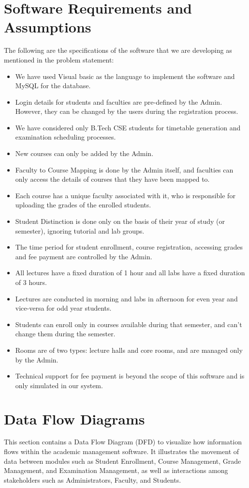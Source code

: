 \documentclass[12pt,a4paper]{article}
\begin{document}
\section{Software Requirements and Assumptions}
The following are the specifications of the software that we are developing as mentioned in the problem statement:
\begin{itemize}
    \item We have used Visual basic as the language to implement the software and MySQL for the database.
    \item Login details for students and faculties are pre-defined by the Admin. However, they can be changed by the users during the registration process.
    \item We have considered only B.Tech CSE students for timetable generation and examination scheduling processes.
    \item New courses can only be added by the Admin.
    \item Faculty to Course Mapping is done by the Admin itself, and faculties can only access the details of courses that they have been mapped to.
    \item Each course has a unique faculty associated with it, who is responsible for uploading the grades of the enrolled students.
    \item Student Distinction is done only on the basis of their year of study (or semester), ignoring tutorial and lab groups.
    \item The time period for student enrollment, course registration, accessing grades and fee payment are controlled by the Admin.
    \item All lectures have a fixed duration of 1 hour and all labs have a fixed duration of 3 hours.
    \item Lectures are conducted in morning and labs in afternoon for even year and vice-versa for odd year students.
    \item Students can enroll only in courses available during that semester, and can't change them during the semester.
    \item Rooms are of two types: lecture halls and core rooms, and are managed only by the Admin.
    \item Technical support for fee payment is beyond the scope of this software and is only simulated in our system.
\end{itemize}

\section{Data Flow Diagrams}
This section contains a Data Flow Diagram (DFD) to visualize how information flows within the academic management software. It illustrates the movement of data between modules such as Student Enrollment, Course Management, Grade Management, and Examination Management, as well as interactions among stakeholders such as Administrators, Faculty, and Students.
\end{document}
